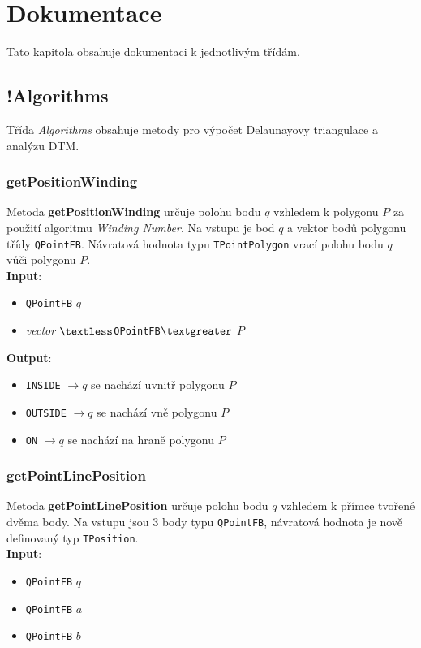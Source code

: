 \documentclass[a4paper, 12pt]{article}
\begin{document}
 
\section{Dokumentace}
Tato kapitola obsahuje dokumentaci k jednotlivým třídám.

\subsection{!Algorithms}
Třída \textit{Algorithms} obsahuje metody pro výpočet Delaunayovy triangulace a analýzu DTM.



\subsubsection*{getPositionWinding}
Metoda \textbf{getPositionWinding} určuje polohu bodu $q$ vzhledem k polygonu $P$ za použití algoritmu \textsl{Winding Number}. Na vstupu je bod $q$ a vektor bodů polygonu třídy \texttt{QPointFB}. Návratová hodnota typu \texttt{TPointPolygon} vrací polohu bodu $q$ vůči polygonu $P$.\\

\textbf{Input}:
\begin{itemize}
\item \texttt{QPointFB} $q$
\item \textsl{vector} $\textless$\texttt{QPointFB}$\textgreater$ $P$
\end{itemize}

\textbf{Output}:
\begin{itemize}
\item \texttt{INSIDE} $\rightarrow q$ se nachází uvnitř polygonu $P$
\item \texttt{OUTSIDE} $\rightarrow q$ se nachází vně polygonu $P$
\item \texttt{ON} $\rightarrow q$ se nachází na hraně polygonu $P$
\end{itemize}

\subsubsection*{getPointLinePosition}
Metoda \textbf{getPointLinePosition} určuje polohu bodu $q$ vzhledem k přímce tvořené dvěma body. Na vstupu jsou 3 body typu \texttt{QPointFB}, návratová hodnota je nově definovaný typ \texttt{TPosition}.\\

\textbf{Input}:
\begin{itemize}
\item \texttt{QPointFB} $q$
\item \texttt{QPointFB} $a$
\item \texttt{QPointFB} $b$
\end{itemize}
\end{document}
